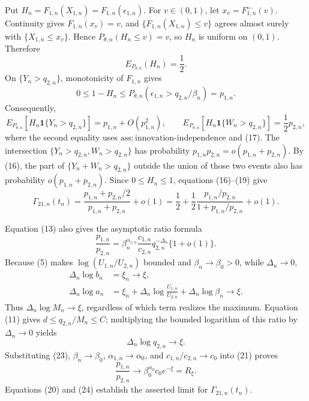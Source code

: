Put \(H_n=F_{1,n}(X_{1,n})=F_{1,n}(\epsilon_{1,n})\). For \(v\in(0,1)\), let \(x_v=F_{1,n}^{\leftarrow}(v)\). Continuity gives \(F_{1,n}(x_v)=v\), and \(\{F_{1,n}(X_{1,n})\leq v\}\) agrees almost surely with \(\{X_{1,n}\leq x_v\}\). Hence \(P_{\theta,n}(H_n\leq v)=v\), so \(H_n\) is uniform on \((0,1)\). Therefore
\[
E_{P_{\theta,n}}(H_n)=\frac12.
\tag{17}
\]
On \(\{Y_n>q_{2,n}\}\), monotonicity of \(F_{1,n}\) gives
\[
0\leq1-H_n
\leq P_{\theta,n}(\epsilon_{1,n}>q_{2,n}/\beta_n)=p_{1,n}.
\tag{18}
\]
Consequently,
\[
E_{P_{\theta,n}}[H_n\mathbf 1\{Y_n>q_{2,n}\}]
=p_{1,n}+O(p_{1,n}^2),
\qquad
E_{P_{\theta,n}}[H_n\mathbf 1\{W_n>q_{2,n}\}]
=\frac12p_{2,n},
\tag{19}
\]
where the second equality uses \(\mathrm{ass{:}innovation\text{-}independence}\) and (17). The intersection \(\{Y_n>q_{2,n},W_n>q_{2,n}\}\) has probability \(p_{1,n}p_{2,n}=o(p_{1,n}+p_{2,n})\). By (16), the part of \(\{Y_n+W_n>q_{2,n}\}\) outside the union of those two events also has probability \(o(p_{1,n}+p_{2,n})\). Since \(0\leq H_n\leq1\), equations (16)--(19) give
\[
\Gamma_{21,n}(t_n)
=\frac{p_{1,n}+p_{2,n}/2}{p_{1,n}+p_{2,n}}+o(1)
=\frac12+\frac12\frac{p_{1,n}/p_{2,n}}{1+p_{1,n}/p_{2,n}}+o(1).
\tag{20}
\]

Equation (13) also gives the asymptotic ratio formula
\[
\frac{p_{1,n}}{p_{2,n}}
=\beta_n^{\alpha_{1,n}}\frac{c_{1,n}}{c_{2,n}}
q_{2,n}^{-\Delta_n}\{1+o(1)\}.
\tag{21}
\]
Because (5) makes \(\log(U_{1,n}/U_{2,n})\) bounded and \(\beta_n\to\beta_0>0\), while \(\Delta_n\to0\),
\[
\begin{aligned}
\Delta_n\log b_n&=\xi_n\longrightarrow\xi,\\
\Delta_n\log a_n
&=\xi_n+\Delta_n\log\frac{U_{1,n}}{U_{2,n}}
+\Delta_n\log\beta_n\longrightarrow\xi.
\end{aligned}
\tag{22}
\]
Thus \(\Delta_n\log M_n\to\xi\), regardless of which term realizes the maximum. Equation (11) gives \(d\leq q_{2,n}/M_n\leq C\); multiplying the bounded logarithm of this ratio by \(\Delta_n\to0\) yields
\[
\Delta_n\log q_{2,n}\longrightarrow\xi.
\tag{23}
\]
Substituting (23), \(\beta_n\to\beta_0\), \(\alpha_{1,n}\to\alpha_0\), and \(c_{1,n}/c_{2,n}\to c_0\) into (21) proves
\[
\frac{p_{1,n}}{p_{2,n}}
\longrightarrow
\beta_0^{\alpha_0}c_0e^{-\xi}=R_\xi.
\tag{24}
\]
Equations (20) and (24) establish the asserted limit for \(\Gamma_{21,n}(t_n)\).

